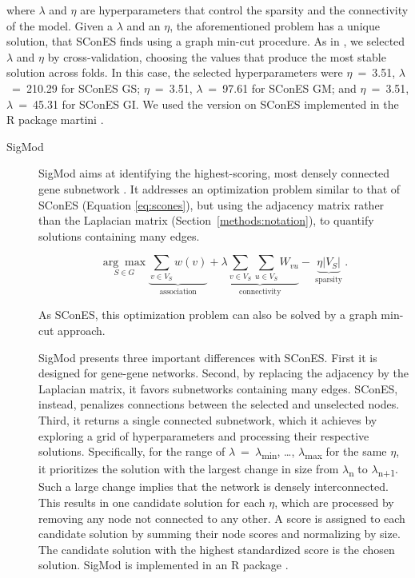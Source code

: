 \documentclass[twocolumn, 11pt]{article}
\begin{document}
\begin{description}
where \(\lambda\) and \(\eta\) are hyperparameters that control the sparsity and the connectivity of the model. Given a $\lambda$ and an $\eta$, the aforementioned problem has a unique solution, that SConES finds using a graph min-cut procedure. As in \citet{azencott_efficient_2013}, we selected \(\lambda\) and \(\eta\) by cross-validation, choosing the values that produce the most stable solution across folds. In this case, the selected hyperparameters were \(\eta\)~=~3.51, \(\lambda\)~=~210.29 for SConES GS; \(\eta\)~=~3.51, \(\lambda\)~=~97.61 for SConES GM; and \(\eta\)~=~3.51, \(\lambda\)~=~45.31 for SConES GI. We used the version on SConES implemented in the R package martini \cite{martini}.
\end{description}

\begin{description}
\item[{SigMod}] SigMod aims at identifying the highest-scoring, most densely connected gene subnetwork \cite{liu_sigmod:_2017}. It addresses an optimization problem similar to that of SConES (Equation \ref{eq:scones}), but using the adjacency matrix rather than the Laplacian matrix (Section~\ref{methods:notation}), to quantify solutions containing many edges.  

\begin{equation*}
\underset{S \in G}{\arg \max } \underbrace{\sum_{v \in V_S} w(v)}_{\text { association }} + \underbrace{\lambda \sum_{v \in V_S} \sum_{u \in V_S} W_{vu} }_{\text { connectivity }} -\underbrace{\eta \lvert V_S \rvert }_{\text { sparsity }}.
\end{equation*}

As SConES, this optimization problem can also be solved by a graph min-cut approach. 

SigMod presents three important differences with SConES. First it is designed for gene-gene networks. Second, by replacing the adjacency by the Laplacian matrix, it favors subnetworks containing many edges. SConES, instead, penalizes connections between the selected and unselected nodes. Third, it returns a single connected subnetwork, which it achieves by exploring a grid of hyperparameters and processing their respective solutions. Specifically, for the range of \(\lambda\)~=~\(\lambda\)\textsubscript{min}, \dots{}, \(\lambda\)\textsubscript{max} for the same \(\eta\), it prioritizes the solution with the largest change in size from \(\lambda\)\textsubscript{n} to \(\lambda\)\textsubscript{n+1}. Such a large change implies that the network is densely interconnected. This results in one candidate solution for each \(\eta\), which are processed by removing any node not connected to any other. A score is assigned to each candidate solution by summing their node scores and normalizing by size. The candidate solution with the highest standardized score is the chosen solution. SigMod is implemented in an R package \cite{sigmod}.
\end{description}
\end{document}
